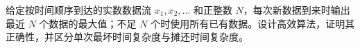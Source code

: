 给定按时间顺序到达的实数数据流 $x_1,x_2,\ldots$ 和正整数 $N$，每次新数据到来时输出最近 $N$ 个数据的最大值；不足 $N$ 个时使用所有已有数据。设计高效算法，证明其正确性，并区分单次最坏时间复杂度与摊还时间复杂度。

